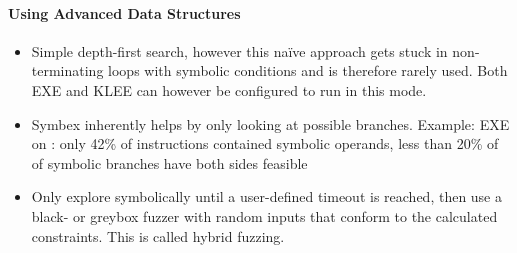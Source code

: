 \documentclass{article}
\begin{document}
\paragraph{Using Advanced Data Structures}
\begin{itemize}
  \item Simple depth-first search, however this naïve approach gets stuck in non-terminating loops with symbolic conditions and is therefore rarely used. Both EXE\cite{EXE} and KLEE\cite{KLEE} can however be configured to run in this mode.
  \item Symbex inherently helps by only looking at possible branches. Example: EXE\cite{EXE} on : only 42\% of instructions contained symbolic operands, less than 20\% of of symbolic branches have both sides feasible\cite{EXE}
  \item Only explore symbolically until a user-defined timeout is reached, then use a black- or greybox fuzzer with random inputs that conform to the calculated constraints. This is called hybrid fuzzing\cite{HybridFuzzTesting}.
\end{itemize}
\end{document}
